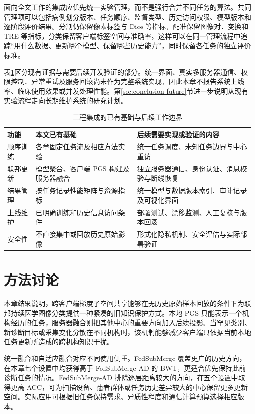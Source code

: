 面向全文工作的集成应优先统一实验管理，而不是强行合并不同任务的算法。共同管理项可以包括病例划分版本、任务顺序、监督类型、历史访问权限、模型版本和逐阶段评价结果。分割仍保留像素标签与 Dice 等指标，配准保留图像对、变换和 TRE 等指标，分类保留客户端标签空间与准确率。这样可以在同一管理流程中追踪“用什么数据、更新哪个模型、保留哪些历史能力”，同时保留各任务的独立评价标准。

表\ref{tab:fedsubmerge-system-boundary}区分现有证据与需要后续开发验证的部分。统一界面、真实多服务器通信、权限控制、异常重试及服务回滚尚未作为完整系统实现，因此本章不报告系统上线率、临床使用效果或并发处理性能。第\ref{sec:conclusion-future}节进一步说明从现有实验流程走向长期维护系统的研究计划。

\begin{table}[htbp]
\centering
\caption{工程集成的已有基础与后续工作边界}
\label{tab:fedsubmerge-system-boundary}
\thesistablefont
\setlength{\tabcolsep}{3pt}
\renewcommand{\arraystretch}{1.18}
\begin{tabularx}{\textwidth}{@{}p{2.0cm}XX@{}}
\toprule
功能 & 本文已有基础 & 后续需要实现或验证的内容 \\
\midrule
顺序训练 & 各章固定任务流及相应方法实验 & 统一任务调度、未知任务边界与中心重访 \\
联邦更新 & 模型聚合、客户端 PGS 构建及服务器融合 & 独立服务器通信、身份认证、消息校验与断线恢复 \\
结果管理 & 按任务记录性能矩阵与资源指标 & 统一模型与数据版本索引、审计记录及可视化界面 \\
上线维护 & 已明确训练和历史信息访问条件 & 部署测试、漂移监测、人工复核与版本回滚 \\
安全性 & 不直接集中或回放历史原始影像 & 形式化隐私机制、安全评估与实际部署验证 \\
\bottomrule
\end{tabularx}
\end{table}

\section{方法讨论}
\label{sec:fedsubmerge-discussion}

本章结果说明，跨客户端梯度子空间共享能够在无历史原始样本回放的条件下为联邦持续医学图像分类提供一种紧凑的旧知识保护方式。本地 PGS 只能表示一个机构经历的任务，服务器融合则把其他中心的重要方向加入后续投影。当罕见类别、新诊断目标或采集变化分散在不同机构时，该机制能够减少客户端只依据当前本地任务更新所造成的跨机构知识干扰。

统一融合和自适应融合对应不同使用侧重。FedSubMerge 覆盖更广的历史方向，在本章七个设置中均获得高于 FedSubMerge-AD 的 BWT，更适合优先保持此前诊断任务的情况。FedSubMerge-AD 排除逐层距离较大的方向，在五个设置中取得更高 ACC，可为扫描设备、患者群体或任务历史差异较大的中心保留更多更新空间。实际应用可根据旧任务保持需求、异质性程度和通信计算预算选择相应版本。

